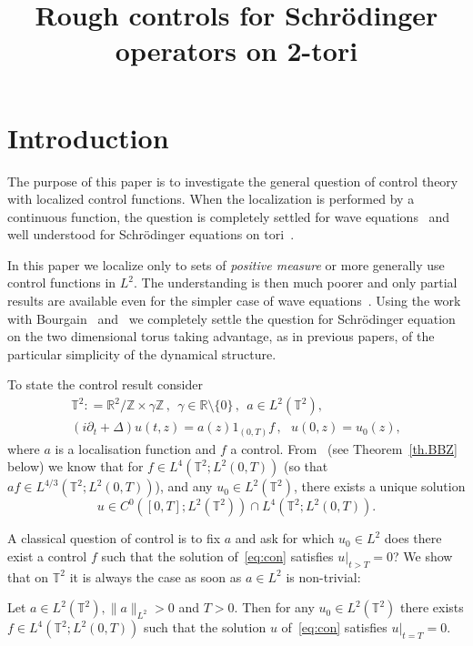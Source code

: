 \documentclass[AHL, Unicode, longabstracts]{cedram}
\title[Rough controls for Schrödinger operators on 2-tori] {Rough controls for Schrödinger operators on 2-tori}
\author[\initial{N.} \lastname{Burq}]{\firstname{Nicolas} \lastname{Burq}}
\author[\initial{M.} \lastname{Zworski}]{\firstname{Maciej} \lastname{Zworski}}
\newcommand{\R}{{\mathbb R}}
\newcommand{\TT}{{\mathbb T}}
\newcommand{\ZZ}{{\mathbb Z}}
\newcommand{\TT}{{\mathbb T}}
\newcommand{\R}{{\mathbb R}}
\newcommand{\ZZ}{{\mathbb Z}}
\begin{document}
\maketitle

\section{Introduction}\label{in}

The purpose of this paper is to investigate the general question of control theory with localized control functions. When the localization is performed by a continuous function, the question is completely settled for wave equations~\cite{BLR,BG} and well understood for Schrödinger equations on tori~\cite{Ha, Ja, Ko, BZ4, AM}.

In this paper we localize only to sets of \emph{positive measure} or more generally use control functions in $ L^2 $. The understanding is then much poorer and only partial results are available even for the simpler case of wave equations~\cite{Bu16,Bu17}. Using the work with Bourgain~\cite{BBZ} and~\cite{BZ4} we completely settle the question for Schrödinger equation on the two dimensional torus taking advantage, as in previous papers, of the particular simplicity of the dynamical structure.


To state the control result consider
\begin{equation}\label{eq:con}
\begin{gathered} \TT^2 : = \R^2 / \ZZ \times \gamma \ZZ \,, \ \ \gamma \in \R \setminus \{
0 \}\,, \ \ a \in L^2 (\TT^2), \\
(i \partial_t + \Delta) u (t, z) = a(z) 1_{(0,T)}f \,, \ \ \ u (0, z) =u_0 (z),
\end{gathered}
\end{equation}
where $a $ is a localisation function and $f$ a control. From~\cite[Proposition~2.2]{BBZ} (see Theorem~\ref{th.BBZ} below) we know that for $f \in L^{4}(\TT^2 ; L^2(0,T))$ (so that $af \in L^{4/3}(\TT^2 ; L^2(0,T))$), and any $u_0 \in L^2(\TT^2)$, there exists a unique solution
\[
u \in C^0 ([0,T]; L^2(\TT^2)) \cap L^4 (\TT^2; L^2(0,T)).
\]

A classical question of control is to fix $ a $ and ask for which $u_0 \in L^2$ does there exist a control $f$ such that the solution of~\eqref{eq:con} satisfies $u |_{t>T} =0$? We show that on $\mathbb{T}^2$ it is always the case as soon as $a \in L^2$ is non-trivial:

\begin{theo}\label{th.2}
Let $a \in L^2(\TT^2), \| a \|_{L^2} >0$ and $ T > 0 $. Then for any $u_0\in L^2(\TT^2)$ there exists $f \in L^4(\TT^2 ; L^2(0,T))$ such that the solution $u$ of~\eqref{eq:con} satisfies $u |_{t=T} =0$.
\end{theo}
\end{document}
